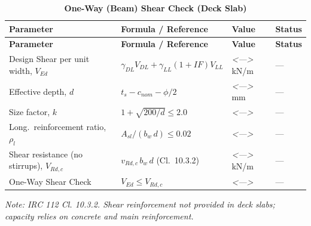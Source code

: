 \documentclass[12pt,a4paper]{report}
\numberwithin{table}{chapter}
\numberwithin{figure}{chapter}
\newcommand{\ReportTableGap}{\vspace{1em}}
\newcommand{\placeholder}[1]{\textit{\textless #1\textgreater}}
\begin{document}
\ReportTableGap
\begin{longtable}{|L{5.5cm}|C{3.5cm}|>{\centering\arraybackslash}p{4.5cm}|C{2cm}|}
\caption{\textbf{One-Way (Beam) Shear Check (Deck Slab)}}\\
\hline
\textbf{Parameter} & \textbf{Formula / Reference} & \textbf{Value} & \textbf{Status} \\[6pt]
\hline
\endfirsthead
\hline
\textbf{Parameter} & \textbf{Formula / Reference} & \textbf{Value} & \textbf{Status} \\[6pt]
\hline
\endhead

Design Shear per unit width, $V_{Ed}$ & $\gamma_{DL} V_{DL} + \gamma_{LL}(1{+}IF)V_{LL}$ & \placeholder{---} kN/m & --- \\[6pt]
\hline
Effective depth, $d$ & $t_s - c_{nom} - \phi/2$ & \placeholder{---} mm & --- \\[6pt]
\hline
Size factor, $k$ & $1 + \sqrt{200/d} \leq 2.0$ & \placeholder{---} & --- \\[6pt]
\hline
Long.\ reinforcement ratio, $\rho_l$ & $A_{sl}/(b_w\,d) \leq 0.02$ & \placeholder{---} & --- \\[6pt]
\hline
Shear resistance (no stirrups), $V_{Rd,c}$ & $v_{Rd,c}\,b_w\,d$ (Cl.\ 10.3.2) & \placeholder{---} kN/m & --- \\[6pt]
\hline
One-Way Shear Check & $V_{Ed} \leq V_{Rd,c}$ & \placeholder{---} & --- \\[6pt]
\hline
\end{longtable}
\noindent\textit{Note: IRC 112 Cl. 10.3.2. Shear reinforcement not provided in deck slabs; capacity relies on concrete and main reinforcement.}
\end{document}
